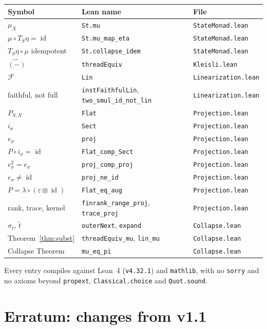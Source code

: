 \documentclass[12pt]{article}
\theoremstyle{plain}
\theoremstyle{remark}
\newcommand{\id}{\operatorname{id}}
\begin{document}
\begin{center}
\renewcommand{\arraystretch}{1.25}
\begin{tabular}{@{}lll@{}}
\textbf{Symbol} & \textbf{Lean name} & \textbf{File}\\\hline
$\mu_X$ & \verb|St.mu| & \verb|StateMonad.lean|\\
$\mu\circ T_S\eta=\id$ & \verb|St.mu_map_eta| & \verb|StateMonad.lean|\\
$T_S\eta\circ\mu$ idempotent & \verb|St.collapse_idem| & \verb|StateMonad.lean|\\
$\widehat{(-)}$ & \verb|threadEquiv| & \verb|Kleisli.lean|\\
$\mathcal F$ & \verb|Lin| & \verb|Linearization.lean|\\
faithful, not full & \verb|instFaithfulLin|, \verb|two_smul_id_not_lin| & \verb|Linearization.lean|\\
$P_{S,X}$ & \verb|Flat| & \verb|Projection.lean|\\
$i_\sigma$ & \verb|Sect| & \verb|Projection.lean|\\
$e_\sigma$ & \verb|proj| & \verb|Projection.lean|\\
$P\circ i_\sigma=\id$ & \verb|Flat_comp_Sect| & \verb|Projection.lean|\\
$e_\sigma^2=e_\sigma$ & \verb|proj_comp_proj| & \verb|Projection.lean|\\
$e_\sigma\neq\id$ & \verb|proj_ne_id| & \verb|Projection.lean|\\
$P=\lambda\circ(\varepsilon\otimes\id)$ & \verb|Flat_eq_aug| & \verb|Projection.lean|\\
rank, trace, kernel & \verb|finrank_range_proj|, \verb|trace_proj| & \verb|Projection.lean|\\
$\sigma_t$, $\widetilde t$ & \verb|outerNext|, \verb|expand| & \verb|Collapse.lean|\\
Theorem~\ref{thm:subst} & \verb|threadEquiv_mu|, \verb|lin_mu| & \verb|Collapse.lean|\\
Collapse Theorem & \verb|mu_eq_pi| & \verb|Collapse.lean|\\
\end{tabular}
\end{center}

Every entry compiles against Lean~4 (\verb|v4.32.1|) and \verb|mathlib|, with no
\verb|sorry| and no axioms beyond \verb|propext|, \verb|Classical.choice| and
\verb|Quot.sound|.

\bigskip
\section{Erratum: changes from v1.1}
\end{document}
